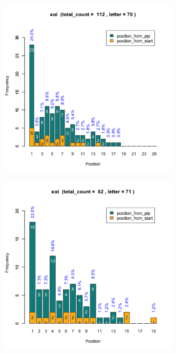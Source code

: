 \documentclass[a4paper]{article}
\begin{document}
\begin{figure}
\begin{subfigure}{0.45\textwidth}
\end{subfigure}
\begin{subfigure}{0.45\textwidth}
\centering
\includegraphics[width=1\linewidth]{../../data/output/paul_R_par/plots/par3_lt70.png}
\end{subfigure}
\begin{subfigure}{0.45\textwidth}
\centering
\includegraphics[width=1\linewidth]{../../data/output/paul_R_par/plots/par3_lt71.png}
\end{subfigure}
\end{figure}
\end{document}
